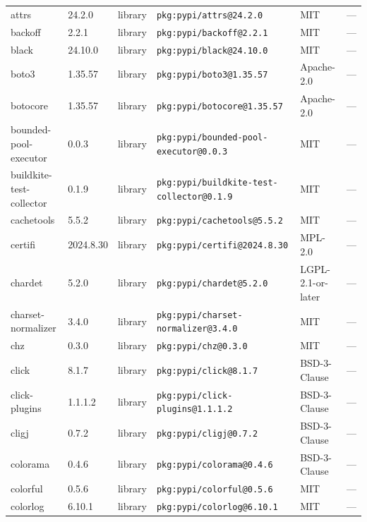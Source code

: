 \documentclass[11pt,a4paper]{article}
\begin{document}
\begin{longtable}{|p{4cm}|p{2cm}|p{1.6cm}|p{5cm}|p{1.5cm}|p{3.5cm}|}
\raggedright attrs & 24.2.0 & library & \small\texttt{pkg:pypi/attrs@24.2.0} & MIT & \small — \\
\raggedright backoff & 2.2.1 & library & \small\texttt{pkg:pypi/backoff@2.2.1} & MIT & \small — \\
\raggedright black & 24.10.0 & library & \small\texttt{pkg:pypi/black@24.10.0} & MIT & \small — \\
\raggedright boto3 & 1.35.57 & library & \small\texttt{pkg:pypi/boto3@1.35.57} & Apache-2.0 & \small — \\
\raggedright botocore & 1.35.57 & library & \small\texttt{pkg:pypi/botocore@1.35.57} & Apache-2.0 & \small — \\
\raggedright bounded-pool-executor & 0.0.3 & library & \small\texttt{pkg:pypi/bounded-pool-executor@0.0.3} & MIT & \small — \\
\raggedright buildkite-test-collector & 0.1.9 & library & \small\texttt{pkg:pypi/buildkite-test-collector@0.1.9} & MIT & \small — \\
\raggedright cachetools & 5.5.2 & library & \small\texttt{pkg:pypi/cachetools@5.5.2} & MIT & \small — \\
\raggedright certifi & 2024.8.30 & library & \small\texttt{pkg:pypi/certifi@2024.8.30} & MPL-2.0 & \small — \\
\raggedright chardet & 5.2.0 & library & \small\texttt{pkg:pypi/chardet@5.2.0} & LGPL-2.1-or-later & \small — \\
\raggedright charset-normalizer & 3.4.0 & library & \small\texttt{pkg:pypi/charset-normalizer@3.4.0} & MIT & \small — \\
\raggedright chz & 0.3.0 & library & \small\texttt{pkg:pypi/chz@0.3.0} & MIT & \small — \\
\raggedright click & 8.1.7 & library & \small\texttt{pkg:pypi/click@8.1.7} & BSD-3-Clause & \small — \\
\raggedright click-plugins & 1.1.1.2 & library & \small\texttt{pkg:pypi/click-plugins@1.1.1.2} & BSD-3-Clause & \small — \\
\raggedright cligj & 0.7.2 & library & \small\texttt{pkg:pypi/cligj@0.7.2} & BSD-3-Clause & \small — \\
\raggedright colorama & 0.4.6 & library & \small\texttt{pkg:pypi/colorama@0.4.6} & BSD-3-Clause & \small — \\
\raggedright colorful & 0.5.6 & library & \small\texttt{pkg:pypi/colorful@0.5.6} & MIT & \small — \\
\raggedright colorlog & 6.10.1 & library & \small\texttt{pkg:pypi/colorlog@6.10.1} & MIT & \small — \\

\end{longtable}
\end{document}
